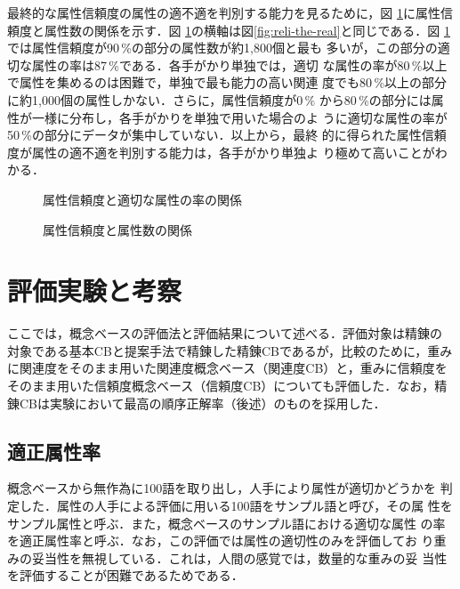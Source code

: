 最終的な属性信頼度の属性の適不適を判別する能力を見るために，図
\ref{fig:reli-num}に属性信頼度と属性数の関係を示す．図
\ref{fig:reli-num}の横軸は図\ref{fig:reli-the-real}と同じである．図
\ref{fig:reli-num}では属性信頼度が90\,\%の部分の属性数が約1,800個と最も
多いが，この部分の適切な属性の率は87\,\%である．各手がかり単独では，適切
な属性の率が80\,\%以上で属性を集めるのは困難で，単独で最も能力の高い関連
度でも80\,\%以上の部分に約1,000個の属性しかない．さらに，属性信頼度が0\,\%
から80\,\%の部分には属性が一様に分布し，各手がかりを単独で用いた場合のよ
うに適切な属性の率が50\,\%の部分にデータが集中していない．以上から，最終
的に得られた属性信頼度が属性の適不適を判別する能力は，各手がかり単独よ
り極めて高いことがわかる．

\begin{figure}[ht]
  \begin{minipage}{.48\linewidth}
    \begin{center}
      \caption{属性信頼度と適切な属性の率の関係}
      \label{fig:reli-the-real}
    \end{center}
  \end{minipage}
  \begin{minipage}{.48\linewidth}
    \begin{center}
      \caption{属性信頼度と属性数の関係}
      \label{fig:reli-num}
    \end{center}
  \end{minipage}
\end{figure}

\section{評価実験と考察}

ここでは，概念ベースの評価法と評価結果について述べる．評価対象は精錬の
対象である基本CBと提案手法で精錬した精錬CBであるが，比較のために，重み
に関連度をそのまま用いた関連度概念ベース（関連度CB）と，重みに信頼度を
そのまま用いた信頼度概念ベース（信頼度CB）についても評価した．なお，精
錬CBは実験において最高の順序正解率（後述）のものを採用した．

\subsection{適正属性率}

概念ベースから無作為に100語を取り出し，人手により属性が適切かどうかを
判定した．属性の人手による評価に用いる100語をサンプル語と呼び，その属
性をサンプル属性と呼ぶ．また，概念ベースのサンプル語における適切な属性
の率を適正属性率と呼ぶ．なお，この評価では属性の適切性のみを評価してお
り重みの妥当性を無視している．これは，人間の感覚では，数量的な重みの妥
当性を評価することが困難であるためである．

